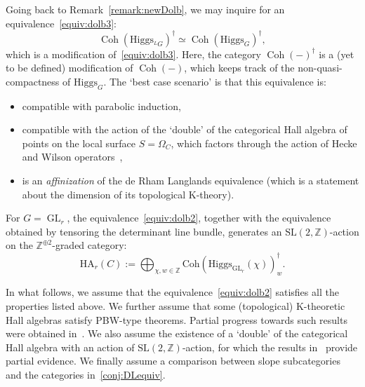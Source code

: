 \documentclass [11pt,oneside,a4paper,mathscr]{amsart}
\theoremstyle{definition}
\newcommand{\Coh}{\operatorname{Coh}}
\newcommand{\GL}{\operatorname{GL}}
\newcommand{\Hig}{\mathrm{Higgs}}
\begin{document}

Going back to Remark~\ref{remark:newDolb}, we may inquire for an equivalence~\eqref{equiv:dolb3}:
 \begin{equation}\label{equiv:dolb2}
  \Coh(\Hig_{^LG})^\dagger\simeq \Coh(\Hig_{G})^\dagger,
  \end{equation} 
  which is a modification of~\eqref{equiv:dolb3}. 
  Here, the category $\Coh(-)^{\dag}$ is a (yet to be defined) modification of $\Coh(-)$, which keeps track of 
 the non-quasi-compactness of $\Hig_G$. The `best case scenario' is that this equivalence is:
 \begin{itemize}
     \item compatible with parabolic induction,
     \item compatible with the action of the `double' of the categorical Hall algebra of points on the local surface $S=\Omega_C$, which factors through the action of Hecke and Wilson operators~\cite{CW}, 
     \item is an \textit{affinization} of the de Rham Langlands equivalence (which is a statement about the dimension of its topological K-theory).
 \end{itemize}
For $G=\GL_r$, the equivalence~\eqref{equiv:dolb2}, together with the equivalence obtained by tensoring the determinant line bundle, generates an $\text{SL}(2,\mathbb{Z})$-action on the $\mathbb{Z}^{\oplus 2}$-graded category: \[\text{HA}_r(C):=\bigoplus_{\chi,w\in\mathbb{Z}} \mathrm{Coh}(\Hig_{\mathrm{GL}_r}(\chi))^\dagger_w.\] 

In what follows, we assume that the equivalence~\eqref{equiv:dolb2} satisfies all the properties listed above. We further assume that some (topological) K-theoretic Hall algebras satisfy PBW-type theorems. 
Partial progress towards such results were obtained in~\cite{PT1, PTtop, PThiggs2}.
We also assume the existence of a `double' of the categorical Hall algebra with an action of $\text{SL}(2,\mathbb{Z})$-action, for which the results in~\cite{CauPT} provide partial evidence.
We finally assume a comparison between slope subcategories and the categories in~\eqref{conj:DLequiv}.
 
\medskip
  
\end{document}
